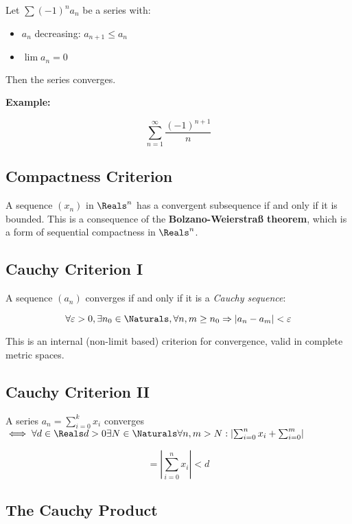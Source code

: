 Let \(\sum {(-1)}^n a_n\) be a series with:

\begin{itemize}

  \item \(a_n\) decreasing: \(a_{n+1} \le a_n\)

  \item \(\lim a_n = 0\)

\end{itemize}

Then the series converges.
\vspace{\baselineskip}

\textbf{Example:}
\vspace{\baselineskip}

\[
    \sum_{n=1}^\infty \frac{{(-1)}^{n+1}}{n}
\]

\subsection{Compactness Criterion}

A sequence \((x_n)\) in \(\Reals^n\) has a convergent subsequence if and only if it is bounded. 
This is a consequence of the \textbf{Bolzano-Weierstraß theorem}, which is a form of sequential 
compactness in \(\Reals^n\).

\subsection{Cauchy Criterion I}

A sequence \((a_n)\) converges if and only if it is a \emph{Cauchy sequence}:

\[
    \forall \varepsilon > 0, \exists n_0 \in \Naturals, \forall n, m \ge n_0 \Rightarrow |a_n - a_m| < \varepsilon
\]

This is an internal (non-limit based) criterion for convergence, valid in complete metric spaces.

\subsection{Cauchy Criterion II}

A series \(a_n = \sum_{i = 0}^{k}x_i\) converges \(\iff \forall d \in \Reals d > 0 
\exists N \in \Naturals \forall n,m > N: \left| \sum_{i = 0}^{n}x_i + \sum_{i=0}^{m}\right|\)

\[
    = \left|\sum_{i = 0}^{n}x_i\right| < d
\]


\subsection{The Cauchy Product}

